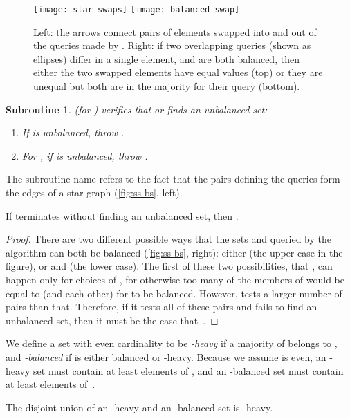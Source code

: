 \documentclass[11pt]{llncs}
\newcommand{\figurescale}{0.5}
\newcommand{\figurescale}{0.45}
\newtheorem{subroutine}{Subroutine}
\begin{document}
\begin{figure}[t]
\centering
\texttt{[image: star-swaps]}\quad
\texttt{[image: balanced-swap]}
\caption{Left: the arrows connect pairs of elements swapped into and out of the queries made by . Right: if two overlapping queries (shown as ellipses) differ in a single element, and are both balanced, then either the two swapped elements have equal values (top) or they are unequal but both are in the majority for their query (bottom).}
\label{fig:ss-bs}
\end{figure}

\begin{subroutine}  (for ) verifies that  or finds an unbalanced set:
\begin{enumerate}
\item If  is unbalanced, throw .
\item For , if  is unbalanced, throw .
\end{enumerate}
\end{subroutine}
The subroutine name refers to the fact that the pairs  defining the queries form the edges of a star graph (\autoref{fig:ss-bs}, left).

\begin{lemma}
If  terminates without finding an unbalanced set, then .
\end{lemma}

\begin{proof}
There are two different possible ways that the sets  and  queried by the algorithm can both be balanced (\autoref{fig:ss-bs}, right): either  (the upper case in the figure), or  and  (the lower case). The first of these two possibilities, that , can happen only for  choices of , for otherwise too many of the members of  would be equal to  (and each other) for  to be balanced. However,  tests a larger number of pairs than that. Therefore,
if it tests all of these pairs and fails to find an unbalanced set, then it must be the case that~.
\end{proof}

We define a set  with even cardinality to be \emph{-heavy} if a majority of  belongs to , and \emph{-balanced} if  is either balanced or -heavy. Because we assume  is even, an -heavy set must contain at least  elements of , and an -balanced set must contain at least  elements of~.
\ifFull
\begin{lemma}
The disjoint union of an -heavy and an -balanced set is -heavy.
\end{lemma}
\end{document}

